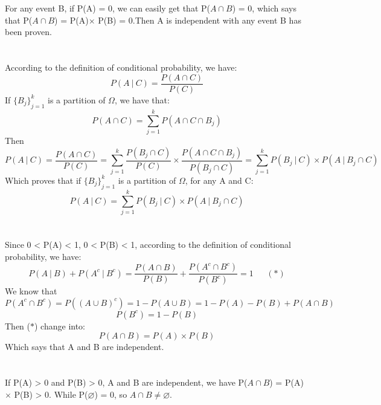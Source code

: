 \documentclass[10.5pt]{article}
\begin{document}
\section{}
For any event B, if P(A) = 0, we can easily get that P($A\cap B$) = 0, which says that P($A\cap B$) = P(A)$\times$ P(B) = 0.Then A is independent with any event B has been proven.

\section{}
According to the definition of conditional probability, we have:$$P(A~|~C) = \frac{P(A\cap C)}{P(C)}$$
\indent
If ${\{B_j\}}_{j=1}^k$ is a partition of $\Omega $, we have that: $$P(A\cap C) = \sum_{j = 1}^{k} P(A\cap C\cap B_j) $$
\indent
Then $$P(A~|~C) = \frac{P(A\cap C)}{P(C)} = \sum_{j = 1}^{k} \frac{P(B_j\cap C)}{P(C)}\times \frac{P(A\cap C\cap B_j)}{P(B_j\cap C)} = \sum_{j = 1}^{k} P(B_j~|~C)\times P(A~|~B_j\cap C)  $$
\indent
Which proves that if ${\{B_j\}}_{j=1}^k$ is a partition of $\Omega $, for any A and C:$$P(A~|~C) = \sum_{j = 1}^{k} P(B_j~|~C)\times P(A~|~B_j\cap C)$$

\section{}
Since 0 < P(A) < 1, 0 < P(B) < 1, according to the definition of conditional probability, we have:$$P(A~|~B) + P(A^c~|~B^c) = \frac{P(A\cap B)}{P(B)} + \frac{P(A^c\cap B^c)}{P(B^c)} =1 ~~~~~~~(*)$$
\indent
We know that $$P(A^c\cap B^c) = P((A\cup B)^c) = 1 - P(A\cup B) = 1 - P(A) - P(B) + P(A\cap B)$$ $$P(B^c) = 1 - P(B)$$
\indent
Then ($*$) change into:$$P(A\cap B) = P(A)\times P(B)$$
\indent
Which says that A and B are independent.

\section{}
If P(A) > 0 and P(B) > 0, A and B are independent, we have P($A\cap B$) = P(A) $\times$ P(B) > 0. While P($\varnothing $) = 0, so $A\cap B \neq \varnothing $.
\end{document}
